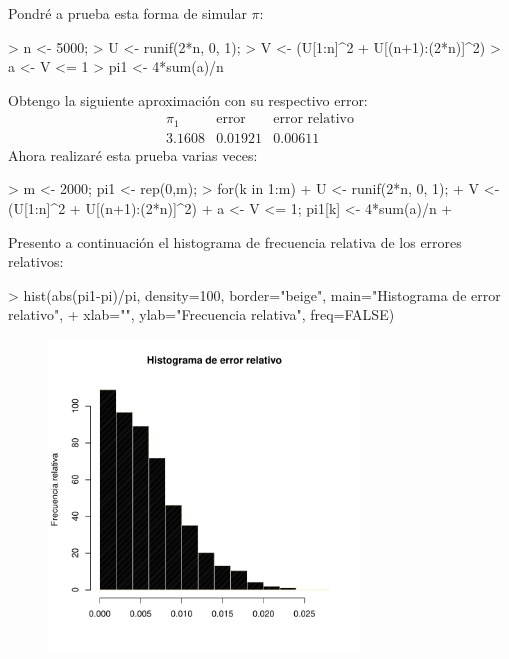 \documentclass[11pt]{article}
\begin{document}
Pondré a prueba esta forma de simular \(\pi\):
\begin{Schunk}
\begin{Sinput}
> n <- 5000; 
> U <- runif(2*n, 0, 1);
> V <- (U[1:n]^2 + U[(n+1):(2*n)]^2)
> a <- V <= 1
> pi1 <- 4*sum(a)/n
\end{Sinput}
\end{Schunk}
Obtengo la siguiente aproximación con su respectivo error:
\[
    \begin{array}{c|c|c}
        \pi_1 & \text{error} & \text{error relativo}
        \\ \hline
        3.1608 & 0.01921 & 0.00611
    \end{array}
\]
Ahora realizaré esta prueba varias veces:
\begin{Schunk}
\begin{Sinput}
> m <- 2000;      pi1 <- rep(0,m);
> for(k in 1:m){
+     U <- runif(2*n, 0, 1);
+     V <- (U[1:n]^2 + U[(n+1):(2*n)]^2)
+     a <- V <= 1;    pi1[k] <- 4*sum(a)/n
+ }
\end{Sinput}
\end{Schunk}
Presento a continuación el histograma de frecuencia relativa de los errores relativos:
\begin{Schunk}
\begin{Sinput}
> hist(abs(pi1-pi)/pi, density=100, border="beige", main="Histograma de error relativo", 
+      xlab="", ylab="Frecuencia relativa", freq=FALSE)
\end{Sinput}
\end{Schunk}
\begin{center}
\begin{figure}[!h]
    \centering
    \includegraphics[width=3.25in]{EPFL-histograma}
\end{figure}
\end{center}
\end{document}
